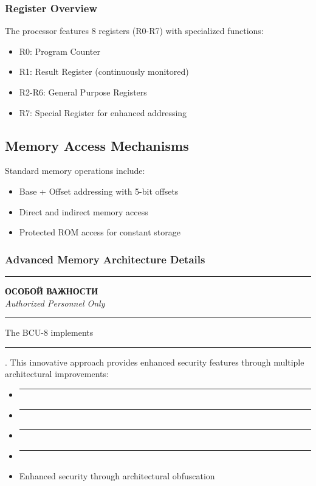 \documentclass[12pt]{article}
\begin{document}
\subsubsection{Register Overview}
The processor features 8 registers (R0-R7) with specialized functions:
\begin{itemize}
    \item R0: Program Counter
    \item R1: Result Register (continuously monitored)
    \item R2-R6: General Purpose Registers
    \item R7: Special Register for enhanced addressing
\end{itemize}

\subsection{Memory Access Mechanisms}
Standard memory operations include:
\begin{itemize}
    \item Base + Offset addressing with 5-bit offsets
    \item Direct and indirect memory access
    \item Protected ROM access for constant storage
\end{itemize}

\subsubsection{Advanced Memory Architecture Details}
\begin{center}
\textcolor{sovietred}{\rule{0.8\textwidth}{0.4pt}}

\textbf{\foreignlanguage{russian}{ОСОБОЙ ВАЖНОСТИ}}\\
\textit{Authorized Personnel Only}

\rule{0.8\textwidth}{0.4pt}
\end{center}

The BCU-8 implements \rule{85mm}{3.5mm}. This innovative approach provides enhanced security features through multiple architectural improvements:

\begin{itemize}
    \item \rule{45mm}{3.5mm}
    \item \rule{50mm}{3.5mm}
    \item \rule{65mm}{3.5mm}
    \item \rule{45mm}{3.5mm}
    \item Enhanced security through architectural obfuscation
\end{itemize}
\end{document}

